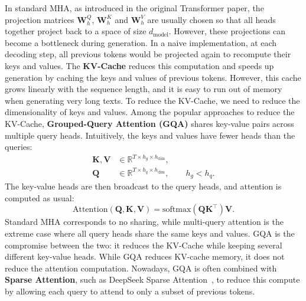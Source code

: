 In standard MHA, as introduced in the original Transformer paper, the projection matrices
$\mathbf{W}^{Q}_h$, $\mathbf{W}^{K}_h$ and $\mathbf{W}^{V}_h$ are usually chosen so that all
heads together project back to a space of size $d_{\mathrm{model}}$. However, these projections
can become a bottleneck during generation. In a naive implementation, at each decoding step, all
previous tokens would be projected again to recompute their keys and values. The
\textbf{KV-Cache} reduces this computation and speeds up generation by caching the keys and values
of previous tokens. However, this cache grows linearly with the sequence length, and it is easy to
run out of memory when generating very long texts. To reduce the KV-Cache, we need to reduce the
dimensionality of keys and values.
Among the popular approaches to reduce the KV-Cache, \textbf{Grouped-Query Attention (GQA)}
shares key-value pairs across multiple query heads. Intuitively, the keys and values have fewer heads
than the queries:
\begin{align}
    \mathbf{K}, \mathbf{V} &\in \mathbb{R}^{T \times h_g \times h_{\mathrm{dim}}}, \\
    \mathbf{Q} &\in \mathbb{R}^{T \times h_q \times h_{\mathrm{dim}}},
    \qquad h_g < h_q .
\end{align}
The key-value heads are then broadcast to the query heads, and attention is computed as usual:
\begin{equation}
    \mathrm{Attention}(\mathbf{Q}, \mathbf{K}, \mathbf{V})
    =
    \mathrm{softmax}\left(\mathbf{Q}\mathbf{K}^{\top}\right)\mathbf{V}.
\end{equation}
Standard MHA corresponds to no sharing, while multi-query attention is the extreme case where all
query heads share the same keys and values. GQA is the compromise between the two: it reduces the
KV-Cache while keeping several different key-value heads.
While GQA reduces KV-cache memory, it does not reduce the attention computation. 
Nowadays, GQA is often combined with \textbf{Sparse Attention}, 
such as DeepSeek Sparse Attention~\citep{deepseekai2025deepseekv32pushingfrontieropen}, to reduce this compute 
by allowing each query to attend to only a subset of previous tokens.


